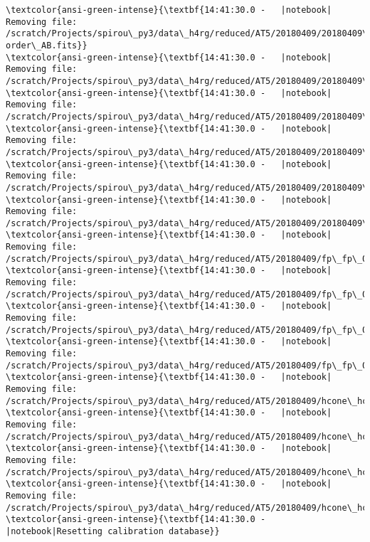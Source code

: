 \documentclass[11pt]{article}
\begin{document}
\begin{Verbatim}[commandchars=\\\{\}]
\textcolor{ansi-green-intense}{\textbf{14:41:30.0 -   |notebook|    Removing file: /scratch/Projects/spirou\_py3/data\_h4rg/reduced/AT5/20180409/20180409\_flat\_dark\_001\_pp\_with-order\_AB.fits}}
\textcolor{ansi-green-intense}{\textbf{14:41:30.0 -   |notebook|    Removing file: /scratch/Projects/spirou\_py3/data\_h4rg/reduced/AT5/20180409/20180409\_fp\_fp\_001\_pp\_tilt.fits}}
\textcolor{ansi-green-intense}{\textbf{14:41:30.0 -   |notebook|    Removing file: /scratch/Projects/spirou\_py3/data\_h4rg/reduced/AT5/20180409/20180409\_dark\_flat\_001\_pp\_blaze\_C.fits}}
\textcolor{ansi-green-intense}{\textbf{14:41:30.0 -   |notebook|    Removing file: /scratch/Projects/spirou\_py3/data\_h4rg/reduced/AT5/20180409/20180409\_dark\_flat\_001\_pp\_flat\_C.fits}}
\textcolor{ansi-green-intense}{\textbf{14:41:30.0 -   |notebook|    Removing file: /scratch/Projects/spirou\_py3/data\_h4rg/reduced/AT5/20180409/20180409\_flat\_dark\_001\_pp\_blaze\_AB.fits}}
\textcolor{ansi-green-intense}{\textbf{14:41:30.0 -   |notebook|    Removing file: /scratch/Projects/spirou\_py3/data\_h4rg/reduced/AT5/20180409/20180409\_flat\_dark\_001\_pp\_flat\_AB.fits}}
\textcolor{ansi-green-intense}{\textbf{14:41:30.0 -   |notebook|    Removing file: /scratch/Projects/spirou\_py3/data\_h4rg/reduced/AT5/20180409/fp\_fp\_001\_pp\_e2ds\_AB.fits}}
\textcolor{ansi-green-intense}{\textbf{14:41:30.0 -   |notebook|    Removing file: /scratch/Projects/spirou\_py3/data\_h4rg/reduced/AT5/20180409/fp\_fp\_001\_pp\_e2ds\_A.fits}}
\textcolor{ansi-green-intense}{\textbf{14:41:30.0 -   |notebook|    Removing file: /scratch/Projects/spirou\_py3/data\_h4rg/reduced/AT5/20180409/fp\_fp\_001\_pp\_e2ds\_B.fits}}
\textcolor{ansi-green-intense}{\textbf{14:41:30.0 -   |notebook|    Removing file: /scratch/Projects/spirou\_py3/data\_h4rg/reduced/AT5/20180409/fp\_fp\_001\_pp\_e2ds\_C.fits}}
\textcolor{ansi-green-intense}{\textbf{14:41:30.0 -   |notebook|    Removing file: /scratch/Projects/spirou\_py3/data\_h4rg/reduced/AT5/20180409/hcone\_hcone\_001\_pp\_e2ds\_AB.fits}}
\textcolor{ansi-green-intense}{\textbf{14:41:30.0 -   |notebook|    Removing file: /scratch/Projects/spirou\_py3/data\_h4rg/reduced/AT5/20180409/hcone\_hcone\_001\_pp\_e2ds\_A.fits}}
\textcolor{ansi-green-intense}{\textbf{14:41:30.0 -   |notebook|    Removing file: /scratch/Projects/spirou\_py3/data\_h4rg/reduced/AT5/20180409/hcone\_hcone\_001\_pp\_e2ds\_B.fits}}
\textcolor{ansi-green-intense}{\textbf{14:41:30.0 -   |notebook|    Removing file: /scratch/Projects/spirou\_py3/data\_h4rg/reduced/AT5/20180409/hcone\_hcone\_001\_pp\_e2ds\_C.fits}}
\textcolor{ansi-green-intense}{\textbf{14:41:30.0 -   |notebook|Resetting calibration database}}

\end{Verbatim}
\end{document}
